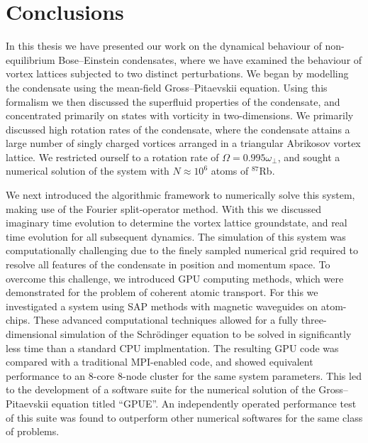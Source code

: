 
\section{Conclusions}
In this thesis we have presented our work on the dynamical behaviour of non-equilibrium Bose--Einstein condensates, where we have examined the behaviour of vortex lattices subjected to two distinct perturbations. We began by modelling the condensate using the mean-field Gross--Pitaevskii equation. Using this formalism we then discussed the superfluid properties of the condensate, and concentrated primarily on states with vorticity in two-dimensions. We primarily discussed high rotation rates of the condensate, where the condensate attains a large number of singly charged vortices arranged in a triangular Abrikosov vortex lattice. We restricted ourself to a rotation rate of $\Omega = 0.995\omega_\perp$, and sought a numerical solution of the system with $N\approx 10^{6}$ atoms of $^{87}$Rb.

We next introduced the algorithmic framework to numerically solve this system, making use of the Fourier split-operator method. With this we discussed imaginary time evolution to determine the vortex lattice groundstate, and real time evolution for all subsequent dynamics. The simulation of this system was computationally challenging due to the finely sampled numerical grid required to resolve all features of the condensate in position and momentum space. To overcome this challenge, we introduced GPU computing methods, which were demonstrated for the problem of coherent atomic transport. For this we investigated a system using SAP methods with magnetic waveguides on atom-chips. These advanced computational techniques allowed for a fully three-dimensional simulation of the Schr\"odinger equation to be solved in significantly less time than a standard CPU implmentation. The resulting GPU code was compared with a traditional MPI-enabled code, and showed equivalent performance to an 8-core 8-node cluster for the same system parameters. This led to the development of a software suite for the numerical solution of the Gross--Pitaevskii equation titled ``GPUE''. An independently operated performance test of this suite was found to outperform other numerical softwares for the same class of problems.

